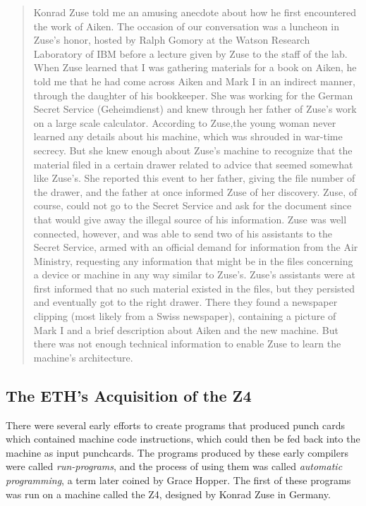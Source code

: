 	\begin{quotation}
		Konrad Zuse told me an amusing anecdote about how he first
		encountered the work of Aiken. The occasion of our conversation was
		a luncheon in Zuse's honor, hosted by Ralph Gomory at the Watson
		Research Laboratory of IBM before a lecture given by Zuse to the
		staff of the lab. When Zuse learned that I was gathering materials
		for a book on Aiken, he told me that he had come across Aiken and
		Mark I in an indirect manner, through the daughter of his
		bookkeeper. She was working for the German Secret
		Service (Geheimdienst) and knew through her father of Zuse's work on
		a large scale calculator. According to Zuse,the young woman never
		learned any details about his machine, which was shrouded in
		war-time secrecy. But she knew enough about Zuse's machine to
		recognize that the material filed in a certain drawer related to
		advice that seemed somewhat like Zuse's. She reported this event
		to her father, giving the file number of the drawer, and the father
		at once informed Zuse of her discovery. Zuse, of course, could not
		go to the Secret Service and ask for the document since that would
		give away the illegal source of his information. Zuse was well
		connected, however, and was able to send two of his assistants to
		the Secret Service, armed with an official demand for information
		from the Air Ministry, requesting any information that might be in
		the files concerning a device or machine in any way similar
		to Zuse's. Zuse's assistants were at first informed that no such
		material existed in the files, but they persisted and eventually got
		to the right drawer. There they found a newspaper clipping (most
		likely from a Swiss newspaper), containing a picture of Mark I and a
		brief description about Aiken and the new machine. But there was not
		enough technical information to enable Zuse to learn the machine's
		architecture.
	\end{quotation}
\fi

\subsection{The ETH's Acquisition of the Z4}

There were several early efforts to create programs that produced punch
cards which contained machine code instructions, which could then be fed back
into the machine as input punchcards. The programs produced by these early
compilers were called \textit{run-programs}, and the process of using them was
called \textit{automatic programming}, a term later coined by Grace Hopper. The
first of these programs was run on a machine called the Z4, designed by Konrad
Zuse in Germany.

